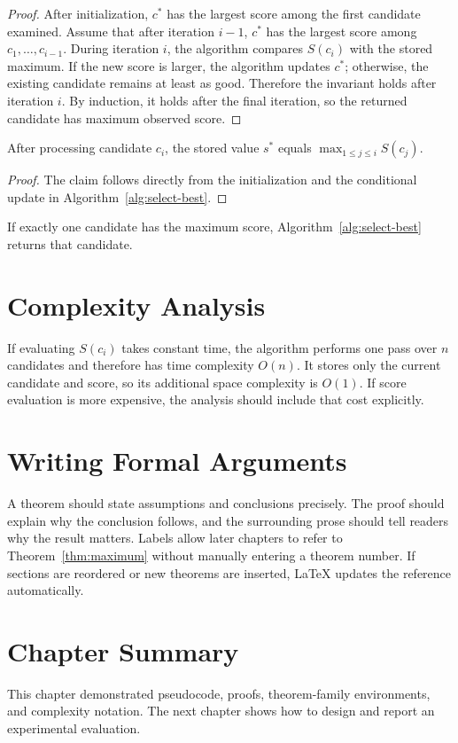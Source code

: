 \begin{proof}
After initialization, \(c^*\) has the largest score among the first candidate examined. Assume that after iteration \(i-1\), \(c^*\) has the largest score among \(c_1,\ldots,c_{i-1}\). During iteration \(i\), the algorithm compares \(S(c_i)\) with the stored maximum. If the new score is larger, the algorithm updates \(c^*\); otherwise, the existing candidate remains at least as good. Therefore the invariant holds after iteration \(i\). By induction, it holds after the final iteration, so the returned candidate has maximum observed score.
\end{proof}

\begin{lemma}
After processing candidate \(c_i\), the stored value \(s^*\) equals \(\max_{1\leq j\leq i} S(c_j)\).
\end{lemma}

\begin{proof}
The claim follows directly from the initialization and the conditional update in Algorithm~\ref{alg:select-best}.
\end{proof}

\begin{corollary}
If exactly one candidate has the maximum score, Algorithm~\ref{alg:select-best} returns that candidate.
\end{corollary}

\section{Complexity Analysis}

If evaluating \(S(c_i)\) takes constant time, the algorithm performs one pass over \(n\) candidates and therefore has time complexity \(O(n)\). It stores only the current candidate and score, so its additional space complexity is \(O(1)\). If score evaluation is more expensive, the analysis should include that cost explicitly.

\section{Writing Formal Arguments}

A theorem should state assumptions and conclusions precisely. The proof should explain why the conclusion follows, and the surrounding prose should tell readers why the result matters. Labels allow later chapters to refer to Theorem~\ref{thm:maximum} without manually entering a theorem number. If sections are reordered or new theorems are inserted, LaTeX updates the reference automatically.

\section{Chapter Summary}

This chapter demonstrated pseudocode, proofs, theorem-family environments, and complexity notation. The next chapter shows how to design and report an experimental evaluation.
